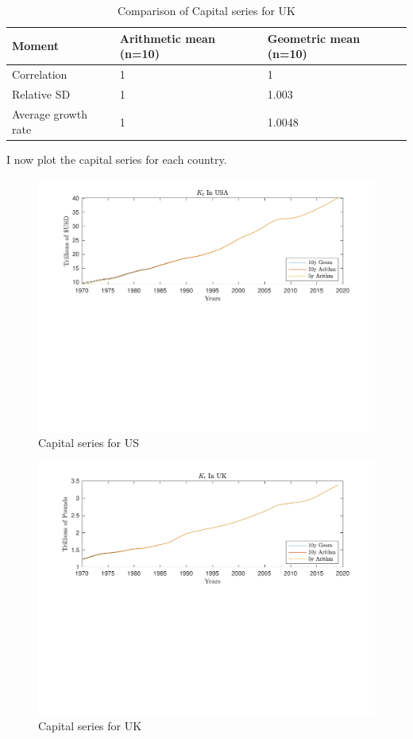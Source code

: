 \documentclass[11pt]{article}
\theoremstyle{mytheoremstyle}
\theoremstyle{mytheoremstyle}
\theoremstyle{myproblemstyle}
\begin{document}
\begin{table}[h]
    \centering
    \caption{Comparison of Capital series for UK}
    \label{tab:UK_K}
    \begin{tabular}{@{}lll@{}}
    \toprule
    Moment & Arithmetic mean (n=10) & Geometric mean (n=10) \\ \midrule
    Correlation & 1 & 1 \\
    Relative SD & 1 & 1.003 \\
    Average growth rate & 1 & 1.0048 \\ \bottomrule
    \end{tabular}
    \end{table}

I now plot the capital series for each country.

\begin{figure}
    \includegraphics[trim = 0in 3.2in 0in 0in, clip, width=1\textwidth]{out/Capital_Series_US.pdf}
    \caption{Capital series for US}
\end{figure}

\begin{figure}[h]
    \includegraphics[trim = 0in 3.2in 0in 0in, clip, width=1\textwidth]{out/Capital_Series_uk.pdf}
    \caption{Capital series for UK}
\end{figure}
\end{document}
